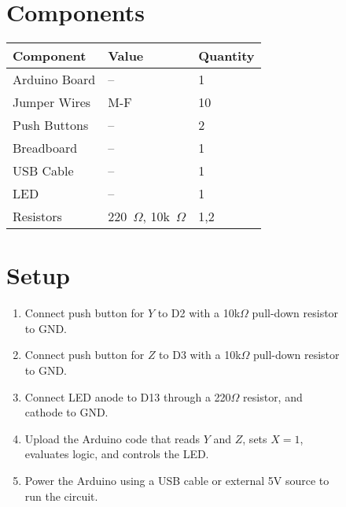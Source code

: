\documentclass[12pt,a4paper]{article}
\begin{document}
\begin{figure}[H]
\begin{minipage}[t]{0.48\textwidth}
    \section*{Components}
    \small
    \renewcommand{\arraystretch}{1.3}
    \begin{tabular}{|l|l|l|}
      \hline
      \textbf{Component} & \textbf{Value} & \textbf{Quantity} \\ \hline
      Arduino Board & -- & 1 \\ \hline
      Jumper Wires & M-F & 10 \\ \hline
      Push Buttons & -- & 2 \\ \hline
      Breadboard & -- & 1 \\ \hline
      USB Cable & -- & 1 \\ \hline
      LED & -- & 1 \\ \hline
      Resistors & 220~$\Omega$, 10k~$\Omega$ & 1,2 \\ \hline
    \end{tabular}

    \vspace{0.8cm}
    \section*{Setup}
    \small
    \begin{enumerate}[left=0pt]
      \item Connect push button for $Y$ to D2 with a 10k$\Omega$ pull-down resistor to GND.
      \item Connect push button for $Z$ to D3 with a 10k$\Omega$ pull-down resistor to GND.
      \item Connect LED anode to D13 through a 220$\Omega$ resistor, and cathode to GND.
      \item Upload the Arduino code that reads $Y$ and $Z$, sets $X = 1$, evaluates logic, and controls the LED.
      \item Power the Arduino using a USB cable or external 5V source to run the circuit.
    \end{enumerate}
  \end{minipage}
\end{figure}


\newpage
\end{document}
